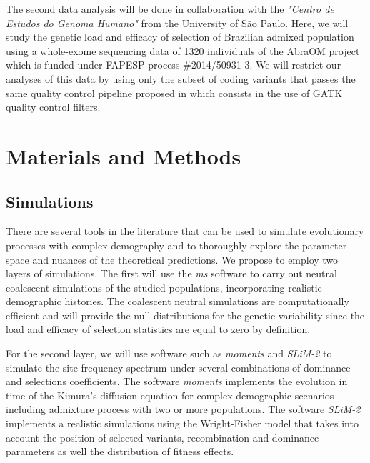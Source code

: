 \documentclass[a4paper, 12pt]{article}
\begin{document}
The second data analysis will be done in collaboration with the \textit{"Centro
  de Estudos do Genoma Humano"}  from the University of São Paulo. Here, we
will study the genetic load and efficacy of selection of Brazilian admixed
population using a whole-exome sequencing data  of 1320 individuals of the
AbraOM project \citep{Naslavsky2017} which is funded under FAPESP process
\#2014/50931-3. We will restrict our analyses of this data by using only  the
subset of coding variants that passes the same quality control pipeline
proposed in \cite{Naslavsky2017} which consists in the use of GATK quality
control filters. 


\section{Materials and Methods}

\subsection{Simulations}

There are several tools in the literature that can be used to simulate
evolutionary processes with complex demography and to thoroughly explore the
parameter space and nuances of the theoretical predictions. We propose to
employ two layers of simulations. The first  will use the \textit{ms} software
\citep{Hudson2002} to carry out neutral coalescent simulations of the studied
populations, incorporating realistic demographic histories. The coalescent
neutral simulations are computationally efficient and will provide the null
distributions for the genetic variability since the load and efficacy of
selection statistics are equal to zero by definition.

For the second layer, we will use software such as \textit{moments}
\citep{Jouganous2017} and \textit{SLiM-2} \citep{Haller2016} to simulate the
site frequency spectrum  under several combinations of dominance and selections
coefficients. The software \textit{moments} implements the evolution in time of
the Kimura's diffusion equation for complex demographic scenarios including
admixture process with two or more populations. The software \textit{SLiM-2}
implements a  realistic simulations using the Wright-Fisher model that takes
into account the position of selected variants, recombination and dominance
parameters as well the distribution of fitness effects. 
\end{document}
